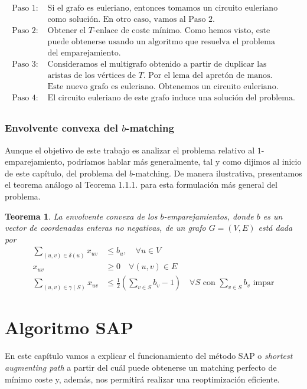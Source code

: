 \documentclass[twoside,a4paper,openright,12pt,tikz]{book}
\newtheorem{thm}{Teorema}[section]
\begin{document}
\begin{align*}
\text{Paso 1: }& \text{Si el grafo es euleriano, entonces tomamos un circuito euleriano}\\
&\text{como solución. En otro caso, vamos al Paso 2.}\\
\text{Paso 2: }&\text{Obtener el $T$-enlace de coste mínimo. Como hemos visto, este}\\
&\text{puede obtenerse usando un algoritmo que resuelva el problema}\\
&\text{del emparejamiento.}\\
\text{Paso 3: }&\text{Consideramos el multigrafo obtenido a partir de duplicar las}\\
&\text{aristas de los vértices de $T$. Por el lema del apretón de manos.}\\
&\text{Este nuevo grafo es euleriano. Obtenemos un circuito euleriano.}\\
\text{Paso 4: }& \text{El circuito euleriano de este grafo induce una solución del problema.}\\
\end{align*} 
\subsection{Envolvente convexa del $b$-matching}
Aunque el objetivo de este trabajo es analizar el problema relativo al $1$-emparejamiento, podríamos hablar más generalmente, tal y como dijimos al inicio de este capítulo, del problema del $b$-matching. De manera ilustrativa, presentamos el teorema análogo al Teorema 1.1.1. para esta formulación más general del problema. 
\begin{thm}
La envolvente convexa de los $b$-emparejamientos, donde $b$ es un vector de coordenadas enteras no negativas, de un grafo $G=(V,E)$ está dada por
\begin{align*}
\sum_{(u,v)\in\delta(u)} x_{uv} &\leq b_u, \quad \forall u\in V\\
x_{uv} &\geq 0 \quad \forall(u,v)\in E\\
\sum_{(u,v)\in \gamma(S)} x_{uv}& \leq \frac{1}{2}\left(\sum_{v\in S} b_v -1\right) \quad \forall S \text{ con $\sum_{v\in S} b_v$ impar}
\end{align*}
\end{thm}

\chapter{Algoritmo SAP}
En este capítulo vamos a explicar el funcionamiento del método SAP o \textit{shortest augmenting path} a partir del cuál puede obtenerse un matching perfecto de mínimo coste y, además, nos permitirá realizar una reoptimización eficiente.
\end{document}

